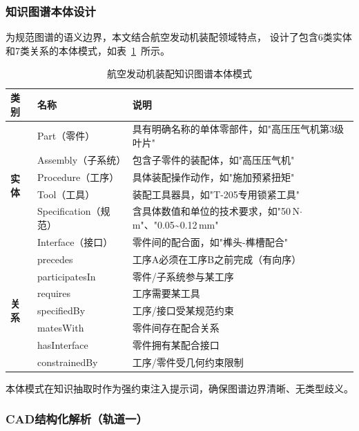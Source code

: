 \subsubsection{知识图谱本体设计}
\label{sec:ontology}

为规范图谱的语义边界，本文结合航空发动机装配领域特点，
设计了包含6类实体和7类关系的本体模式，如表~\ref{tab:ontology}~所示。

\begin{table}[htbp]
  \centering
  \caption{航空发动机装配知识图谱本体模式}
  \label{tab:ontology}
  \renewcommand{\arraystretch}{1.3}
  \begin{tabularx}{\linewidth}{llX}
    \toprule
    \textbf{类别} & \textbf{名称} & \textbf{说明} \\
    \midrule
    \multirow{6}{*}{\textbf{实体}}
      & Part（零件）       & 具有明确名称的单体零部件，如"高压压气机第3级叶片" \\
      & Assembly（子系统） & 包含子零件的装配体，如"高压压气机" \\
      & Procedure（工序）  & 具体装配操作动作，如"施加预紧扭矩" \\
      & Tool（工具）       & 装配工具器具，如"T-205专用锁紧工具" \\
      & Specification（规范）& 含具体数值和单位的技术要求，如"50\,N$\cdot$m"、"0.05\textasciitilde0.12\,mm" \\
      & Interface（接口）  & 零件间的配合面，如"榫头-榫槽配合" \\
    \midrule
    \multirow{7}{*}{\textbf{关系}}
      & precedes          & 工序A必须在工序B之前完成（有向序） \\
      & participatesIn    & 零件/子系统参与某工序 \\
      & requires          & 工序需要某工具 \\
      & specifiedBy       & 工序/接口受某规范约束 \\
      & matesWith         & 零件间存在配合关系 \\
      & hasInterface      & 零件拥有某配合接口 \\
      & constrainedBy     & 工序/零件受几何约束限制 \\
    \bottomrule
  \end{tabularx}
\end{table}

本体模式在知识抽取时作为强约束注入提示词，确保图谱边界清晰、无类型歧义。

\subsubsection{CAD结构化解析（轨道一）}
\label{sec:cad}

